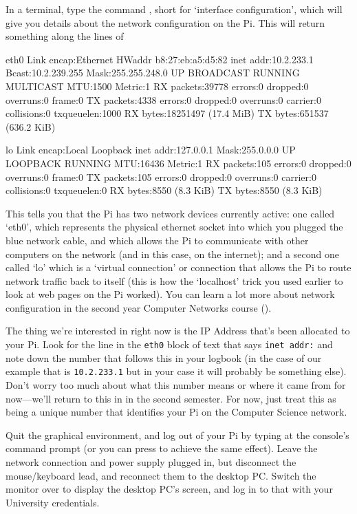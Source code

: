 In a terminal, type the command , short for `interface configuration', which will give you details about the network configuration on the Pi. This will return something along the lines of

\begin{ttoutenv}
eth0      Link encap:Ethernet  HWaddr b8:27:eb:a5:d5:82
          inet addr:10.2.233.1  Bcast:10.2.239.255  Mask:255.255.248.0
          UP BROADCAST RUNNING MULTICAST  MTU:1500  Metric:1
          RX packets:39778 errors:0 dropped:0 overruns:0 frame:0
          TX packets:4338 errors:0 dropped:0 overruns:0 carrier:0
          collisions:0 txqueuelen:1000
          RX bytes:18251497 (17.4 MiB)  TX bytes:651537 (636.2 KiB)

lo        Link encap:Local Loopback
          inet addr:127.0.0.1  Mask:255.0.0.0
          UP LOOPBACK RUNNING  MTU:16436  Metric:1
          RX packets:105 errors:0 dropped:0 overruns:0 frame:0
          TX packets:105 errors:0 dropped:0 overruns:0 carrier:0
          collisions:0 txqueuelen:0
          RX bytes:8550 (8.3 KiB)  TX bytes:8550 (8.3 KiB)
\end{ttoutenv}

This tells you that the Pi has two network devices currently active: one called `eth0', which represents the physical ethernet socket into which you plugged the blue network cable, and which allows the Pi to communicate with other computers on the network (and in this case, on the internet); and a second one called `lo' which is a `virtual connection' or  connection that allows the Pi to route network traffic back to itself (this is how the `localhost' trick you used earlier to look at web pages on the Pi worked). You can learn a lot more about network configuration in the second year Computer Networks course ().

The thing we're interested in right now is the IP Address that's been allocated to your Pi. Look for the line in the \texttt{eth0} block of text that says \texttt{inet addr:} and note down the number that follows this in your logbook (in the case of our example that is \texttt{10.2.233.1} but in your case it will probably be something else). Don't worry too much about what this number means or where it came from for now---we'll return to this in  in the second semester. For now, just treat this as being a unique number that identifies your Pi on the Computer Science network.

Quit the graphical environment, and log out of your Pi by typing  at the console's command prompt (or you can press  to achieve the same effect). Leave the network connection and power supply plugged in, but disconnect the mouse/keyboard lead, and reconnect them to the desktop PC. Switch the monitor over to display the desktop PC's screen, and log in to that with your University credentials.

